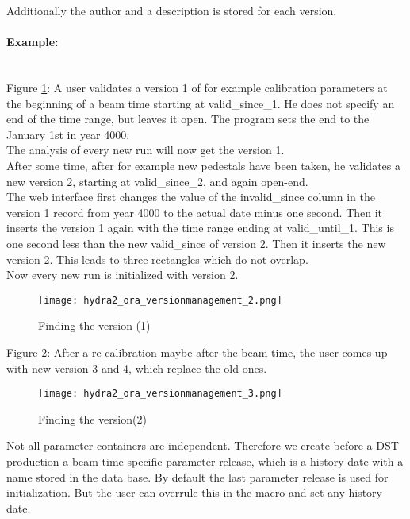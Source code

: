 Additionally the author and a description is stored for each version.

\paragraph{Example:} ~\\
Figure \ref{fig:oraVersionmanagementFinding1}: A user validates a version 1 of for example calibration parameters at the 
beginning of a beam time starting at valid\_since\_1. He does not specify an end of the time range, but leaves it open. The 
program sets the end to the January 1st  in year 4000.\\ 
The analysis of every new run will now get the version 1.\\
After some time, after for example new pedestals have been taken, he validates a new version 2, starting at valid\_since\_2, 
and again open-end.\\
The web interface first changes the value of the invalid\_since column in the version 1 record from year 4000 to the actual 
date minus one second. Then it inserts the version 1 again with the time range ending at valid\_until\_1. This is one second 
less than the new valid\_since of version 2. Then it inserts the new version 2. This leads to three rectangles which do not 
overlap.\\
Now every new run is initialized with version 2.
\begin{figure}[\htb]
  \centering
  \texttt{[image: hydra2\_ora\_versionmanagement\_2.png]}
  \caption[Finding the version (1)]{Finding the version (1)}
  \label{fig:oraVersionmanagementFinding1}
\end{figure}

Figure \ref{fig:oraVersionmanagementFinding2}: After a re-calibration maybe after the beam time, the user comes up with new 
version 3 and 4, which replace the old ones.
\begin{figure}[\htb]
  \centering
  \texttt{[image: hydra2\_ora\_versionmanagement\_3.png]}
  \caption[Finding the version(2)]{Finding the version(2)}
  \label{fig:oraVersionmanagementFinding2}
\end{figure}

Not all parameter containers are independent. Therefore we create before a DST production a beam time specific parameter release, 
which is a history date with a name stored in the data base. By default the last parameter release is used for initialization. 
But the user can overrule this in the macro and set any history date.
\clearpage


